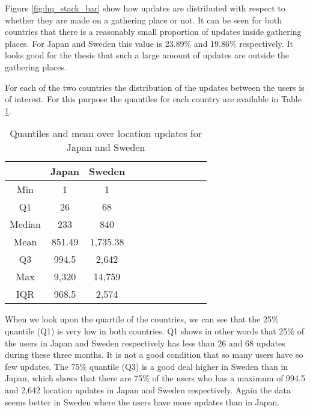 Figure \ref{fig:hq_stack_bar} show how updates are distributed with respect to whether they are made on a gathering place or not. It can be seen for both countries that there is a reasonably small proportion of updates inside gathering places. For Japan and Sweden this value is 23.89\% and 19.86\% respectively. 
It looks good for the thesis that such a large amount of updates are outside the gathering places. 

For each of the two countries the distribution of the updates between the users is of interest. For this purpose the quantiles for each country are available in Table \ref{tab:stat_loc_updates}. 


\begin{table}[htbp]
        \centering
        \small
        \setlength\tabcolsep{2pt}
        \begin{tabular}{|c|c|c|c|c|c|c|c|c|c|c|}
            \hline
                         & Japan      &   Sweden      \\[-1pt]
            \hline
                 Min     &    1       &   1           \\
            \hline
                 Q1      &  26        &   68      \\
            \hline
                 Median  & 233     &   840      \\
            \hline
                 Mean    &  851.49   &  1,735.38     \\
            \hline
                 Q3      & 994.5    &   2,642     \\
            \hline
                 Max     &  9,320 &  14,759     \\
            \hline
                 IQR     &  968.5   &   2,574     \\
            \hline
            
        \end{tabular}
        \caption{Quantiles and mean over location updates for Japan and Sweden} %
        \label{tab:stat_loc_updates}
\end{table}


When we look upon the quartile of the countries, we can see that the 25\% quantile (Q1) is very low in both countries. Q1 shows in other words that 25\% of the users in Japan and Sweden respectively has less than 26 and 68 updates during these three months. It is not a good condition that so many users have so few updates. The 75\% quantile (Q3) is a good deal higher in Sweden than in Japan, which shows that there are 75\% of the users who has a maximum of 994.5 and 2,642 location updates in Japan and Sweden respectively. Again the data seems better in Sweden where the users have more updates than in Japan. \\ 


